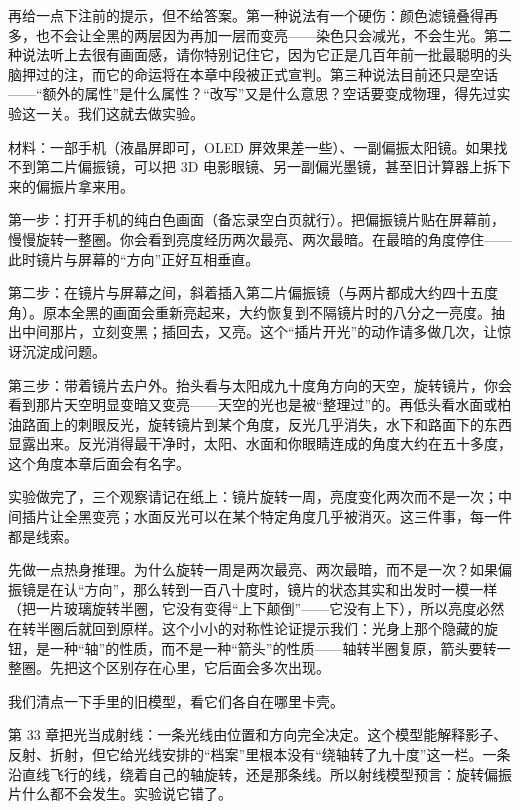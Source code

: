 再给一点下注前的提示，但不给答案。第一种说法有一个硬伤：颜色滤镜叠得再多，也不会让全黑的两层因为再加一层而变亮——染色只会减光，不会生光。第二种说法听上去很有画面感，请你特别记住它，因为它正是几百年前一批最聪明的头脑押过的注，而它的命运将在本章中段被正式宣判。第三种说法目前还只是空话——“额外的属性”是什么属性？“改写”又是什么意思？空话要变成物理，得先过实验这一关。我们这就去做实验。


\begin{experiment}[三片“滤芯”与屏幕里的暗格]
材料：一部手机（液晶屏即可，OLED 屏效果差一些）、一副偏振太阳镜。如果找不到第二片偏振镜，可以把 3D 电影眼镜、另一副偏光墨镜，甚至旧计算器上拆下来的偏振片拿来用。

第一步：打开手机的纯白色画面（备忘录空白页就行）。把偏振镜片贴在屏幕前，慢慢旋转一整圈。你会看到亮度经历两次最亮、两次最暗。在最暗的角度停住——此时镜片与屏幕的“方向”正好互相垂直。

第二步：在镜片与屏幕之间，斜着插入第二片偏振镜（与两片都成大约四十五度角）。原本全黑的画面会重新亮起来，大约恢复到不隔镜片时的八分之一亮度。抽出中间那片，立刻变黑；插回去，又亮。这个“插片开光”的动作请多做几次，让惊讶沉淀成问题。

第三步：带着镜片去户外。抬头看与太阳成九十度角方向的天空，旋转镜片，你会看到那片天空明显变暗又变亮——天空的光也是被“整理过”的。再低头看水面或柏油路面上的刺眼反光，旋转镜片到某个角度，反光几乎消失，水下和路面下的东西显露出来。反光消得最干净时，太阳、水面和你眼睛连成的角度大约在五十多度，这个角度本章后面会有名字。
\end{experiment}

实验做完了，三个观察请记在纸上：镜片旋转一周，亮度变化两次而不是一次；中间插片让全黑变亮；水面反光可以在某个特定角度几乎被消灭。这三件事，每一件都是线索。

先做一点热身推理。为什么旋转一周是两次最亮、两次最暗，而不是一次？如果偏振镜是在认“方向”，那么转到一百八十度时，镜片的状态其实和出发时一模一样（把一片玻璃旋转半圈，它没有变得“上下颠倒”——它没有上下），所以亮度必然在转半圈后就回到原样。这个小小的对称性论证提示我们：光身上那个隐藏的旋钮，是一种“轴”的性质，而不是一种“箭头”的性质——轴转半圈复原，箭头要转一整圈。先把这个区别存在心里，它后面会多次出现。


我们清点一下手里的旧模型，看它们各自在哪里卡壳。

第 33 章把光当成射线：一条光线由位置和方向完全决定。这个模型能解释影子、反射、折射，但它给光线安排的“档案”里根本没有“绕轴转了九十度”这一栏。一条沿直线飞行的线，绕着自己的轴旋转，还是那条线。所以射线模型预言：旋转偏振片什么都不会发生。实验说它错了。

